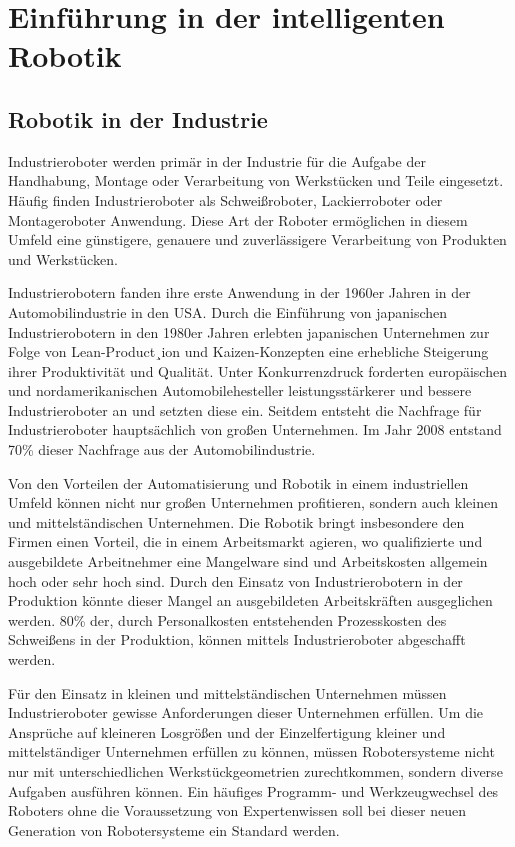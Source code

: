 \chapter{Einführung in der intelligenten Robotik}
\section{Robotik in der Industrie} \label{sec:Industrieroboter}
Industrieroboter werden primär in der Industrie für die Aufgabe der Handhabung, Montage oder Verarbeitung von Werkstücken und Teile eingesetzt. Häufig finden Industrieroboter als Schweißroboter, Lackierroboter oder Montageroboter Anwendung. Diese Art der Roboter ermöglichen in diesem Umfeld eine günstigere, genauere und zuverlässigere Verarbeitung von Produkten und Werkstücken. \autocite{maier2016grundlagen}

Industrierobotern fanden ihre erste Anwendung in der 1960er Jahren in der Automobilindustrie in den USA. Durch die Einführung von japanischen Industrierobotern in den 1980er Jahren erlebten japanischen Unternehmen zur Folge von Lean-Product¸ion und Kaizen-Konzepten eine erhebliche Steigerung ihrer Produktivität und Qualität. Unter Konkurrenzdruck  forderten europäischen und nordamerikanischen Automobilehesteller leistungsstärkerer und bessere Industrieroboter an und setzten diese ein. Seitdem entsteht die Nachfrage für Industrieroboter hauptsächlich von großen Unternehmen. Im Jahr 2008 entstand 70\% dieser Nachfrage aus der Automobilindustrie.\autocite{Bierfreund+2008+135+140}

Von den Vorteilen der Automatisierung und Robotik in einem industriellen Umfeld können nicht nur großen Unternehmen profitieren, sondern auch kleinen und mittelständischen Unternehmen. Die Robotik bringt insbesondere den Firmen einen Vorteil, die in einem Arbeitsmarkt agieren, wo qualifizierte und ausgebildete Arbeitnehmer eine Mangelware sind und Arbeitskosten allgemein hoch oder sehr hoch sind. Durch den Einsatz von Industrierobotern in der Produktion könnte dieser Mangel an ausgebildeten Arbeitskräften ausgeglichen werden. 80\% der, durch Personalkosten entstehenden Prozesskosten des Schweißens in der Produktion, können mittels Industrieroboter abgeschafft werden. \autocite{glaser2008industrial}

Für den Einsatz in kleinen und mittelständischen Unternehmen müssen Industrieroboter gewisse Anforderungen dieser Unternehmen erfüllen. Um die Ansprüche auf kleineren Losgrößen und der Einzelfertigung kleiner und mittelständiger Unternehmen erfüllen zu können, müssen Robotersysteme nicht nur mit unterschiedlichen Werkstückgeometrien zurechtkommen, sondern diverse Aufgaben ausführen können. Ein häufiges Programm- und Werkzeugwechsel des Roboters ohne die Voraussetzung von Expertenwissen soll bei dieser neuen Generation von Robotersysteme ein Standard werden. \autocite{Bierfreund+2008+135+140}

